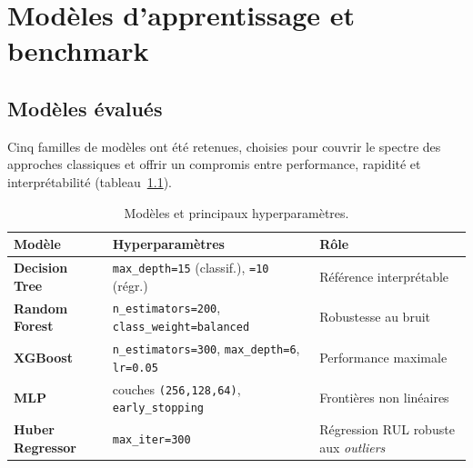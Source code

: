 \chapter{Modèles d'apprentissage et benchmark}
\label{chap:bench}

\section{Modèles évalués}
Cinq familles de modèles ont été retenues, choisies pour couvrir le spectre des approches
classiques et offrir un compromis entre performance, rapidité et interprétabilité
(tableau~\ref{tab:hyper}).

\begin{table}[h]
\centering\small
\caption{Modèles et principaux hyperparamètres.}
\label{tab:hyper}
\begin{tabular}{>{\bfseries}l p{6.2cm} p{4.2cm}}
\toprule
Modèle & Hyperparamètres & Rôle \\
\midrule
Decision Tree & \texttt{max\_depth=15} (classif.), \texttt{=10} (régr.) & Référence interprétable \\
Random Forest & \texttt{n\_estimators=200}, \texttt{class\_weight=balanced} & Robustesse au bruit \\
XGBoost & \texttt{n\_estimators=300}, \texttt{max\_depth=6}, \texttt{lr=0.05} & Performance maximale \\
MLP & couches \texttt{(256,128,64)}, \texttt{early\_stopping} & Frontières non linéaires \\
Huber Regressor & \texttt{max\_iter=300} & Régression RUL robuste aux \emph{outliers} \\
\bottomrule
\end{tabular}
\end{table}

